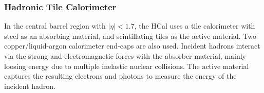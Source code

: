 
\subsubsection{Hadronic Tile Calorimeter}
In the central barrel region with $|\eta| < 1.7$, the HCal uses a tile calorimeter with steel as an absorbing material, and scintillating tiles as the active material.
Two copper/liquid-argon calorimeter end-caps are also used.
Incident hadrons interact via the strong and electromagnetic forces with the absorber material, mainly loosing energy due to multiple inelastic nuclear collisions.
The active material captures the resulting electrons and photons to measure the energy of the incident hadron.






